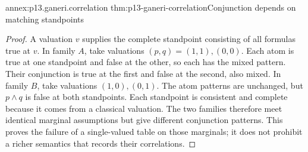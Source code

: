 \begin{annexitem}{annex:p13.ganeri.correlation}
 {thm:p13-ganeri-correlation}{Conjunction depends on matching standpoints}
\begin{proof}
A valuation \(v\) supplies the complete standpoint consisting of all
formulas true at \(v\). In family \(A\), take valuations
\((p,q)=(1,1),(0,0)\). Each atom is true at one standpoint and false
at the other, so each has the mixed pattern. Their conjunction is
true at the first and false at the second, also mixed.
In family \(B\), take valuations \((1,0),(0,1)\). The atom patterns
are unchanged, but \(p\land q\) is false at both standpoints.
Each standpoint is consistent and complete because it comes from
a classical valuation. The two families therefore meet identical
marginal assumptions but give different conjunction patterns.
This proves the failure of a single-valued table on those marginals;
it does not prohibit a richer semantics that records their correlations.
\end{proof}
\end{annexitem}

